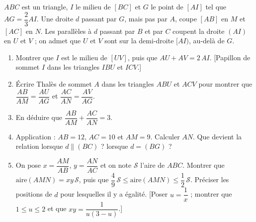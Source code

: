 \documentclass[12pt,a4paper]{article}
\begin{document}
\begin{exo}[title={Une droite par le centre de gravité}, stars=4]
$ABC$ est un triangle, $I$ le milieu de $[BC]$ et $G$ le point de $[AI]$ tel que $AG=\dfrac23AI$. Une droite $d$ passant par $G$, mais pas par $A$, coupe $[AB]$ en $M$ et $[AC]$ en $N$. Les parallèles à $d$ passant par $B$ et par $C$ coupent la droite $(AI)$ en $U$ et $V$ ; on admet que $U$ et $V$ sont sur la demi-droite $[AI)$, au-delà de $G$.

\begin{center}
\end{center}
\begin{enumerate}
  \item Montrer que $I$ est le milieu de $[UV]$, puis que $AU+AV=2\,AI$. [Papillon de sommet $I$ dans les triangles $IBU$ et $ICV$.]
  \item Écrire Thalès de sommet $A$ dans les triangles $ABU$ et $ACV$ pour montrer que $\dfrac{AB}{AM}=\dfrac{AU}{AG}$ et $\dfrac{AC}{AN}=\dfrac{AV}{AG}$.
  \item En déduire que $\dfrac{AB}{AM}+\dfrac{AC}{AN}=3$.
  \item Application : $AB=12$, $AC=10$ et $AM=9$. Calculer $AN$. Que devient la relation lorsque $d\parallel(BC)$ ? lorsque $d=(BG)$ ?
  \item On pose $x=\dfrac{AM}{AB}$, $y=\dfrac{AN}{AC}$ et on note $\mathcal S$ l'aire de $ABC$. Montrer que $\text{aire}(AMN)=xy\,\mathcal S$, puis que $\dfrac49\,\mathcal S\leq\text{aire}(AMN)\leq\dfrac12\,\mathcal S$. Préciser les positions de $d$ pour lesquelles il y a égalité. [Poser $u=\dfrac1x$ ; montrer que $1\leq u\leq2$ et que $xy=\dfrac1{u(3-u)}$.]
\end{enumerate}
\end{exo}
\end{document}
